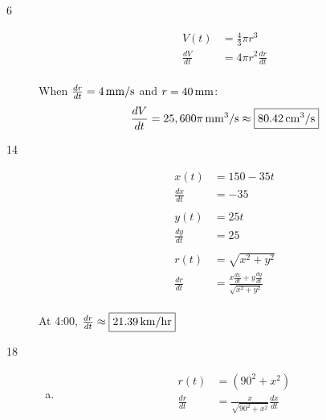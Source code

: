 \documentclass[letterpaper, landscape]{exam}
\begin{document}
\begin{description}
    \item[6]
      \begin{align*}
        V(t)          & = \frac{4}{3} \pi r^3 \\
        \frac{dV}{dt} & = 4 \pi r^2 \frac{dr}{dt} \\
      \end{align*}

      When $\frac{dr}{dt} = \unit[4]{mm/s}$ and $r = \unit[40]{mm}$:
      \[
        \frac{dV}{dt} = \unit[25,600 \pi]{mm^3/s} \approx \boxed{ \unit[80.42]{cm^3/s} }
      \]

    \item[14]
      \begin{align*}
        x(t)          & = 150 - 35 t \\
        \frac{dx}{dt} & = -35 \\
        \\
        y(t)          & = 25 t \\
        \frac{dy}{dt} & = 25 \\
        \\
        r(t)          & = \sqrt{x^2 + y^2} \\
        \frac{dr}{dt} & = \frac{x \frac{dx}{dt} + y \frac{dy}{dt}}{\sqrt{x^2 + y^2}} \\
      \end{align*}

      At 4:00, $\frac{dr}{dt} \approx \boxed{ \unit[21.39]{km/hr} }$



    \item[18]
      \begin{enumerate}[(a)]

        \item 
          \begin{align*}
            r(t)          & = \left( 90^2 + x^2 \right) \\
            \frac{dr}{dt} & = \frac{x}{\sqrt{90^2 + x^2}} \frac{dx}{dt} \\
          \end{align*}


\end{enumerate}
\end{description}
\end{document}
